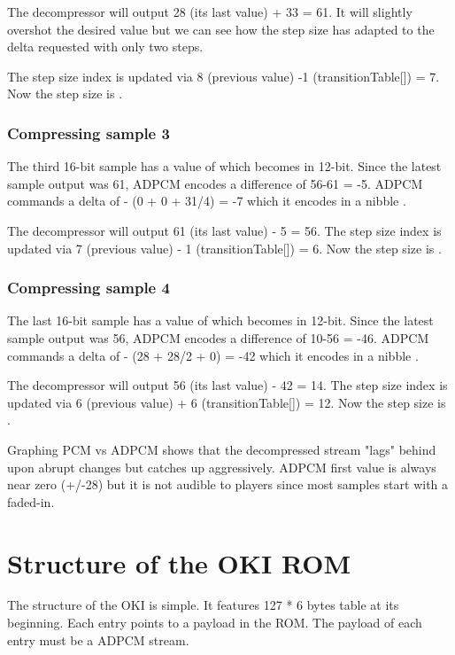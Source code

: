 The decompressor will output 28 (its last value) + 33 = 61. It will slightly overshot the desired value but we can see how the step size has adapted to the delta requested with only two steps. 

The step size index is updated via 8 (previous value) -1 (transitionTable[]) = 7. Now the step size is .

\subsubsection{Compressing sample 3}
The third 16-bit sample has a value of  which becomes  in 12-bit. Since the latest sample output was 61, ADPCM encodes a difference of 56-61 = -5. ADPCM commands a delta of - (0 + 0 + 31/4) = -7 which it encodes in a nibble . 

The decompressor will output 61 (its last value) - 5 = 56. The step size index is updated via 7 (previous value) - 1  (transitionTable[]) = 6. Now the step size is .

\subsubsection{Compressing sample 4}
The last 16-bit sample has a value of  which becomes  in 12-bit. Since the latest sample output was 56, ADPCM encodes a difference of 10-56 = -46. ADPCM commands a delta of - (28 + 28/2 + 0) = -42 which it encodes in a nibble . 

The decompressor will output 56 (its last value) - 42 = 14. The step size index is updated via 6 (previous value) + 6 (transitionTable[]) = 12. Now the step size is .

Graphing PCM vs ADPCM shows that the decompressed stream "lags" behind upon abrupt changes but catches up aggressively. ADPCM first value is always near zero (+/-28) but it is not audible to players since most samples start with a faded-in. 


\section{Structure of the OKI ROM}
The structure of the OKI is simple. It features 127 * 6 bytes table at its beginning. Each entry points to a payload in the ROM. The payload of each entry must be a ADPCM stream.

